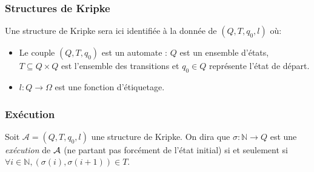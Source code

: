 \documentclass[10pt,a4paper]{article}
\begin{document}
\subsubsection{Structures de Kripke}
Une structure de Kripke sera ici identifiée à la donnée de $(Q,T,q_0,l)$ où:
\begin{itemize}
\item Le couple $(Q,T, q_0)$ est un automate : $Q$ est un ensemble d'états, $T \subseteq Q \times Q$ est l'ensemble des transitions et $q_0 \in Q$ représente l'état de départ.
\item $l : Q \to \Omega$ est une fonction d'étiquetage.
\end{itemize}

\subsubsection{Exécution}
Soit $\mathcal{A} = (Q,T,q_0,l)$ une structure de Kripke.
On dira que $\sigma : \mathbb{N} \to Q$ est une \emph{exécution} de $\cal{A}$ (ne partant pas forcément de l'état initial) si et seulement si $\forall i \in \mathbb{N}, (\sigma (i), \sigma (i+1)) \in T$.
\end{document}
